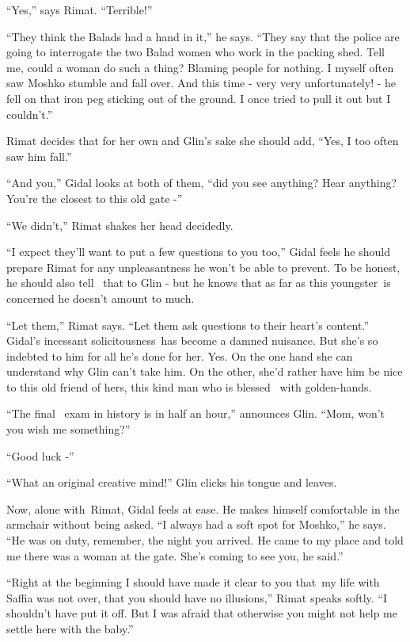 \documentclass[twoside,11pt]{book}
\begin{document}
``Yes,'' says Rimat. ``Terrible!''

``They think the Balads had a hand in it,'' he says. ``They say that the police
are going to interrogate the two Balad women who work in the packing shed. Tell me, could a woman do such a thing?
Blaming people for nothing. I myself often saw Moshko stumble and fall over. And this time - very very unfortunately! -
he fell on that iron peg sticking out of the ground. I once tried to pull it out but I couldn't.''

Rimat decides that for her own and Glin's sake she should add, ``Yes, I too often saw him
fall.''

``And you,'' Gidal looks at both of them, ``did you see anything? Hear anything?
You're the closest to this old gate -''

``We didn't,'' Rimat shakes her head decidedly.

``I expect they'll want to put a few questions to you too,'' Gidal feels he should prepare
Rimat for any unpleasantness he won't be able to prevent. To be honest, he should also tell \ that to Glin - but he
knows that as far as this youngster~is concerned he doesn't amount to much.

``Let them,'' Rimat says. ``Let them ask questions to their heart's
content.'' Gidal's incessant solicitousness~has become a damned nuisance. But she's so indebted to him for
all he's done for her. Yes. On the one hand she can understand why Glin can't take him. On the other, she'd rather have
him be nice to this old friend of hers, this kind man who is blessed \ with golden-hands.

``The final \ exam in history is in half an hour,'' announces Glin. ``Mom, won't
you wish me something?''

``Good luck -''

``What an original creative mind!'' Glin clicks his tongue and leaves.

Now, alone with~Rimat, Gidal feels at ease. He makes himself comfortable in the armchair without being asked.
``I always had a soft spot for Moshko,'' he says. ``He was on duty, remember,
the night you arrived. He came to my place and told me there was a woman at the gate. She's coming to see you, he
said.''

``Right at the beginning I should have made it clear to you that~my life with Saffia was not over, that you
should have no illusions,'' Rimat speaks softly. ``I shouldn't have put it off. But I was afraid that otherwise you
might not help me settle here with the baby.''
\end{document}
